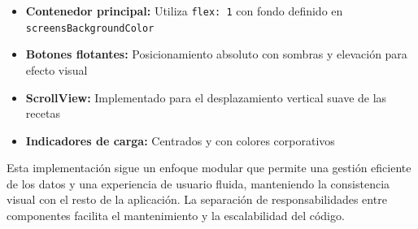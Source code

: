 \documentclass[twoside, openright, 11pt]{report}
\begin{document}
					\begin{itemize}
						\item \textbf{Contenedor principal:} Utiliza \texttt{flex: 1} con fondo definido en \texttt{screensBackgroundColor}
						\item \textbf{Botones flotantes:} Posicionamiento absoluto con sombras y elevación para efecto visual
						\item \textbf{ScrollView:} Implementado para el desplazamiento vertical suave de las recetas
						\item \textbf{Indicadores de carga:} Centrados y con colores corporativos
					\end{itemize}
					
					Esta implementación sigue un enfoque modular que permite una gestión eficiente de los datos y una experiencia de usuario fluida, manteniendo la consistencia visual con el resto de la aplicación. La separación de responsabilidades entre componentes facilita el mantenimiento y la escalabilidad del código.
					
\end{document}
